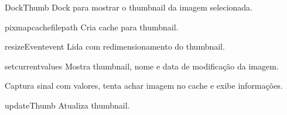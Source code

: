 \documentclass[letterpaper,10pt,portuguese]{manual}
\begin{document}
\hypertarget{veliger.DockThumb}{}\begin{classdesc}{DockThumb}{}
Dock para mostrar o thumbnail da imagem selecionada.

\hypertarget{veliger.DockThumb.pixmapcache}{}\begin{methoddesc}{pixmapcache}{filepath}
Cria cache para thumbnail.
\end{methoddesc}

\hypertarget{veliger.DockThumb.resizeEvent}{}\begin{methoddesc}{resizeEvent}{event}
Lida com redimensionamento do thumbnail.
\end{methoddesc}

\hypertarget{veliger.DockThumb.setcurrent}{}\begin{methoddesc}{setcurrent}{values}
Mostra thumbnail, nome e data de modificação da imagem.

Captura sinal com valores, tenta achar imagem no cache e exibe
informações.
\end{methoddesc}

\hypertarget{veliger.DockThumb.updateThumb}{}\begin{methoddesc}{updateThumb}{}
Atualiza thumbnail.
\end{methoddesc}
\end{classdesc}
\end{document}
